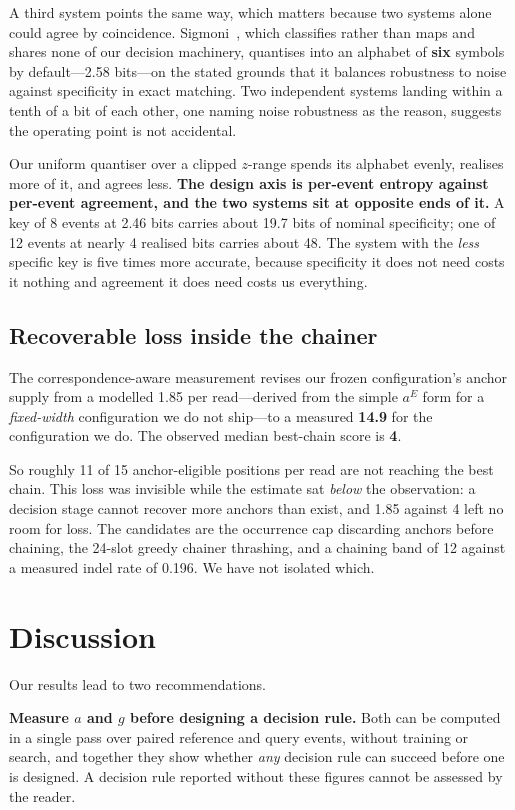 \documentclass[runningheads]{llncs}
\begin{document}
A third system points the same way, which matters because two systems alone could agree by
coincidence.
Sigmoni~\cite{sigmoni}, which classifies rather than maps and shares none of our decision
machinery, quantises into an alphabet of \textbf{six} symbols by default---2.58 bits---on the
stated grounds that it balances robustness to noise against specificity in exact matching. Two
independent systems landing within a tenth of a bit of each other, one naming noise robustness
as the reason, suggests the operating point is not accidental.

Our uniform quantiser over a clipped $z$-range spends its alphabet evenly, realises more of it,
and agrees less. \textbf{The design axis is per-event entropy against per-event agreement, and
the two systems sit at opposite ends of it.} A key of 8 events at 2.46 bits carries about 19.7
bits of nominal specificity; one of 12 events at nearly 4 realised bits carries about 48. The
system with the \emph{less} specific key is five times more accurate, because specificity it
does not need costs it nothing and agreement it does need costs us everything.

\subsection{Recoverable loss inside the chainer}

The correspondence-aware measurement revises our frozen configuration's anchor supply from a
modelled 1.85 per read---derived from the simple $a^{E}$ form for a \emph{fixed-width}
configuration we do not ship---to a measured \textbf{14.9} for the configuration we do. The
observed median best-chain score is \textbf{4}.

So roughly 11 of 15 anchor-eligible positions per read are not reaching the best chain. This loss
was invisible while the estimate sat \emph{below} the observation: a decision stage cannot
recover more anchors than exist, and 1.85 against 4 left no room for loss. The candidates are the
occurrence cap discarding anchors before chaining, the 24-slot greedy chainer thrashing, and a
chaining band of 12 against a measured indel rate of 0.196. We have not isolated which.

\section{Discussion}
Our results lead to two recommendations.

\textbf{Measure $a$ and $g$ before designing a decision rule.} Both can be computed in a single
pass over paired reference and query events, without training or search, and together they show
whether \emph{any} decision rule can succeed before one is designed. A decision rule reported
without these figures cannot be assessed by the reader.
\end{document}
